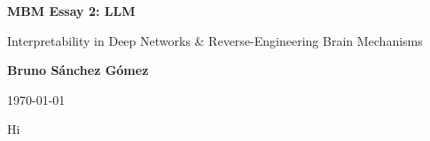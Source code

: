\documentclass[11pt,a4paper]{article}
\begin{document}
\author{Bruno Sánchez Gómez}
\date{\today}

\begin{titlepage}
    \centering
    \vspace*{2cm}
    {\Huge \bfseries MBM Essay 2: LLM \par}
    \vspace{2cm}
    {\Large {\Huge Interpretability in Deep Networks \& Reverse-Engineering Brain Mechanisms} \par}
    \vspace{8cm}
    {\large \textbf{Bruno Sánchez Gómez} \par}
    \vfill
    {\large \today \par}
\end{titlepage}

Hi

%

\clearpage
\printbibliography%
\end{document}

